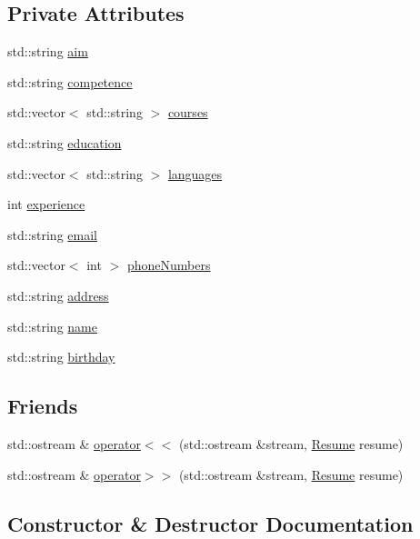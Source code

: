 \subsection*{Private Attributes}
\begin{DoxyCompactItemize}
\item 
std\+::string \hyperlink{class_resume_ace4b574b42cdc210ed457987c045410a}{aim}
\item 
std\+::string \hyperlink{class_resume_ac537d9f0cdc7dd3cb87f9d32d7653d22}{competence}
\item 
std\+::vector$<$ std\+::string $>$ \hyperlink{class_resume_afae66c6c6d6c04b721dce001d25e2d35}{courses}
\item 
std\+::string \hyperlink{class_resume_a60f48cd7a2bb8a9dc44ab62bf8b55231}{education}
\item 
std\+::vector$<$ std\+::string $>$ \hyperlink{class_resume_a4035be2ef3fb8fbdaf60ea05ef0868c3}{languages}
\item 
int \hyperlink{class_resume_af49c8b6d88d53bc168c7abd595b3faf9}{experience}
\item 
std\+::string \hyperlink{class_resume_a376e6779f0f414aec00ca78c36dd1c2a}{email}
\item 
std\+::vector$<$ int $>$ \hyperlink{class_resume_a82cc5431107459a181378b8ce3fbbb0d}{phone\+Numbers}
\item 
std\+::string \hyperlink{class_resume_a31098a2b61a35edbf3c6a525235e5976}{address}
\item 
std\+::string \hyperlink{class_resume_ae99dd9e5aa53753a02b105478a76214a}{name}
\item 
std\+::string \hyperlink{class_resume_a0cfd6d3cfb1a1ce4409e24efb00c9eb1}{birthday}
\end{DoxyCompactItemize}
\subsection*{Friends}
\begin{DoxyCompactItemize}
\item 
std\+::ostream \& \hyperlink{class_resume_a4802836099b1fa0441f74d081cd39cf2}{operator$<$$<$} (std\+::ostream \&stream, \hyperlink{class_resume}{Resume} resume)
\item 
std\+::ostream \& \hyperlink{class_resume_a3e74504543874fb381d00e0e9444d85f}{operator$>$$>$} (std\+::ostream \&stream, \hyperlink{class_resume}{Resume} resume)
\end{DoxyCompactItemize}


\subsection{Constructor \& Destructor Documentation}
\hypertarget{class_resume_a71d23f61d7eb1560a918f6b3bf65fdc5}{}\label{class_resume_a71d23f61d7eb1560a918f6b3bf65fdc5} 
